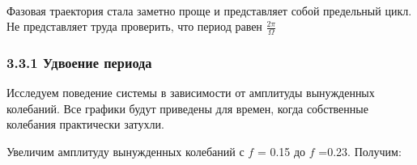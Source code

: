 \documentclass[11pt]{article}
\begin{document}
    \begin{center}
    \end{center}
    { \hspace*{\fill} \\}
    
    Фазовая траектория стала заметно проще и представляет собой предельный
цикл. Не представляет труда проверить, что период равен
\(\frac{2 \pi }{\Omega }\)

\hypertarget{ux443ux434ux432ux43eux435ux43dux438ux435-ux43fux435ux440ux438ux43eux434ux430}{%
\subsubsection{3.3.1 Удвоение
периода}\label{ux443ux434ux432ux43eux435ux43dux438ux435-ux43fux435ux440ux438ux43eux434ux430}}

Исследуем поведение системы в зависимости от амплитуды вынужденных
колебаний. Все графики будут приведены для времен, когда собственные
колебания практически затухли.

Увеличим амплитуду вынужденных колебаний с \(f\) = 0.15 до \(f\) =0.23.
Получим:
\end{document}
